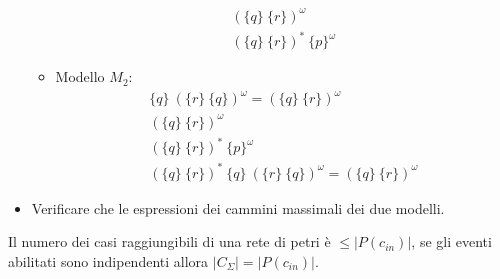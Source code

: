 \begin{esempio}
\begin{itemize}
\begin{itemize}
\begin{equation}
\begin{array}{l}
                                (\{q\} \ \{r\})^\omega \\
                                (\{q\} \ \{r\})^\ast \ \{p\}^\omega
                            \end{array}
                        \end{equation}
                  \item Modello $M_2$:
                        \begin{equation}
                            \begin{array}{l}
                                \{q\} \ (\{r\} \ \{q\})^\omega = (\{q\} \
                                \{r\})^\omega                       \\
                                (\{q\} \ \{r\})^{\omega}            \\
                                (\{q\} \ \{r\})^\ast \ \{p\}^\omega \\
                                (\{q\} \ \{r\})^\ast \ \{q\} \ (\{r\} \
                                \{q\})^\omega = (\{q\} \ \{r\})^\omega
                            \end{array}
                        \end{equation}
              \end{itemize}
        \item Verificare che le espressioni dei cammini massimali dei due modelli.
    \end{itemize}
\end{esempio}
\begin{nota}
    Il numero dei casi raggiungibili di una rete di petri è $\leq |P(c_{in})|$,
    se gli eventi abilitati sono indipendenti allora $|C_\Sigma| = |P(c_{in})|$.
\end{nota}
